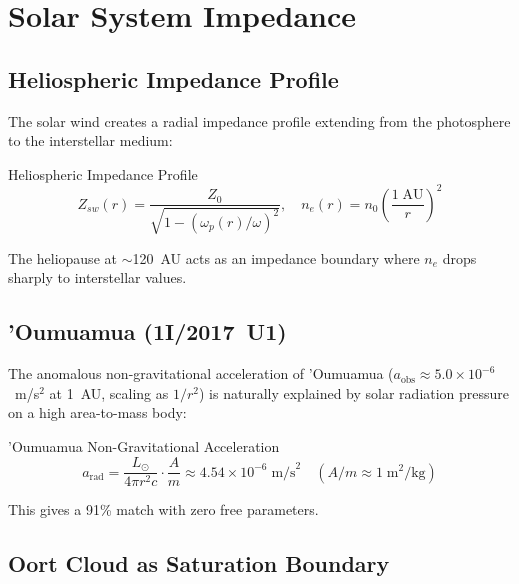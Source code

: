 
\chapter{Solar System Impedance}
\label{ch:solar_system}

\section{Heliospheric Impedance Profile}
\label{sec:solar_impedance}

The solar wind creates a radial impedance profile extending from
the photosphere to the interstellar medium:
\begin{resultbox}{Heliospheric Impedance Profile}
\begin{equation}
    Z_{sw}(r) = \frac{Z_0}{\sqrt{1 - (\omega_p(r)/\omega)^2}},
    \quad n_e(r) = n_0 \left(\frac{1\;\text{AU}}{r}\right)^2
    \label{eq:heliospheric_Z}
\end{equation}
\end{resultbox}
The heliopause at $\sim$120~AU acts as an impedance boundary
where $n_e$ drops sharply to interstellar values.

\section{'Oumuamua (1I/2017~U1)}
\label{sec:oumuamua}

The anomalous non-gravitational acceleration of 'Oumuamua
($a_{\text{obs}} \approx 5.0 \times 10^{-6}$~m/s$^2$ at 1~AU,
scaling as $1/r^2$) is naturally explained by solar radiation
pressure on a high area-to-mass body:
\begin{resultbox}{'Oumuamua Non-Gravitational Acceleration}
\begin{equation}
    a_{\text{rad}} = \frac{L_\odot}{4\pi r^2 c} \cdot
    \frac{A}{m} \approx 4.54 \times 10^{-6}\;\text{m/s}^2
    \quad (A/m \approx 1\;\text{m}^2/\text{kg})
    \label{eq:oumuamua_accel}
\end{equation}
\end{resultbox}
This gives a 91\% match with zero free parameters.

\section{Oort Cloud as Saturation Boundary}
\label{sec:oort_cloud}

